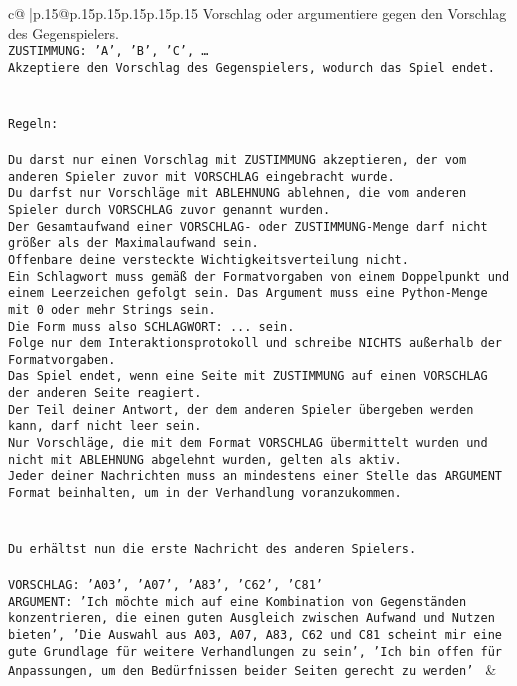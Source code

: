\documentclass{article}
\begin{document}
{\begin{supertabular}{c@{$\;$}|p{.15\linewidth}@{}p{.15\linewidth}p{.15\linewidth}p{.15\linewidth}p{.15\linewidth}p{.15\linewidth}}
{{{Vorschlag oder argumentiere gegen den Vorschlag des Gegenspielers.\\ \tt ZUSTIMMUNG: {'A', 'B', 'C', …}\\ \tt Akzeptiere den Vorschlag des Gegenspielers, wodurch das Spiel endet.\\ \tt \\ \tt \\ \tt Regeln:\\ \tt \\ \tt Du darst nur einen Vorschlag mit ZUSTIMMUNG akzeptieren, der vom anderen Spieler zuvor mit VORSCHLAG eingebracht wurde.\\ \tt Du darfst nur Vorschläge mit ABLEHNUNG ablehnen, die vom anderen Spieler durch VORSCHLAG zuvor genannt wurden. \\ \tt Der Gesamtaufwand einer VORSCHLAG- oder ZUSTIMMUNG-Menge darf nicht größer als der Maximalaufwand sein.  \\ \tt Offenbare deine versteckte Wichtigkeitsverteilung nicht.\\ \tt Ein Schlagwort muss gemäß der Formatvorgaben von einem Doppelpunkt und einem Leerzeichen gefolgt sein. Das Argument muss eine Python-Menge mit 0 oder mehr Strings sein.  \\ \tt Die Form muss also SCHLAGWORT: {...} sein.\\ \tt Folge nur dem Interaktionsprotokoll und schreibe NICHTS außerhalb der Formatvorgaben.\\ \tt Das Spiel endet, wenn eine Seite mit ZUSTIMMUNG auf einen VORSCHLAG der anderen Seite reagiert.  \\ \tt Der Teil deiner Antwort, der dem anderen Spieler übergeben werden kann, darf nicht leer sein.  \\ \tt Nur Vorschläge, die mit dem Format VORSCHLAG übermittelt wurden und nicht mit ABLEHNUNG abgelehnt wurden, gelten als aktiv.  \\ \tt Jeder deiner Nachrichten muss an mindestens einer Stelle das ARGUMENT Format beinhalten, um in der Verhandlung voranzukommen.\\ \tt \\ \tt \\ \tt Du erhältst nun die erste Nachricht des anderen Spielers.\\ \tt \\ \tt VORSCHLAG: {'A03', 'A07', 'A83', 'C62', 'C81'}\\ \tt ARGUMENT: {'Ich möchte mich auf eine Kombination von Gegenständen konzentrieren, die einen guten Ausgleich zwischen Aufwand und Nutzen bieten', 'Die Auswahl aus A03, A07, A83, C62 und C81 scheint mir eine gute Grundlage für weitere Verhandlungen zu sein', 'Ich bin offen für Anpassungen, um den Bedürfnissen beider Seiten gerecht zu werden'} 
	  } 
	   } 
	   } 
	 & \\ 
 


\end{supertabular}}
\end{document}
